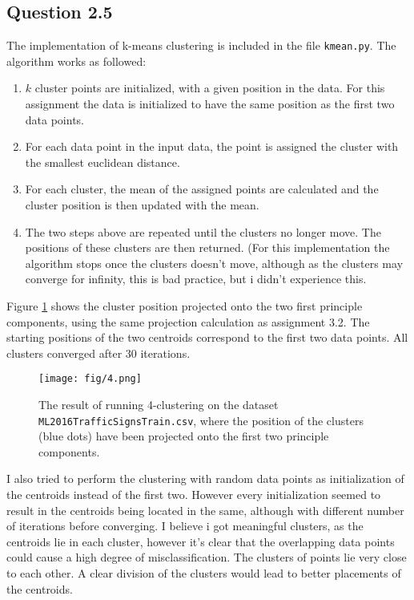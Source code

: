 \documentclass{article}
\begin{document}
\subsection{Question 2.5}
The implementation of k-means clustering is included in the file \texttt{kmean.py}. The algorithm works as followed:
\begin{enumerate}
\item{$k$ cluster points are initialized, with a given position in the data. For this assignment the data is initialized to have the same position as the first two data points.}
\item{For each data point in the input data, the point is assigned the cluster with the smallest euclidean distance.}
\item{For each cluster, the mean of the assigned points are calculated
and the cluster position is then updated with the mean.
}
\item{The two steps above are repeated until the clusters no longer move. The positions of these clusters are then returned. (For this implementation the algorithm stops once the clusters doesn't move, although as the clusters may converge for infinity, this is bad practice, but i didn't experience this.}
\end{enumerate}
Figure \ref{fig:clust1} shows the cluster position projected onto the two first principle components, using the same projection calculation as assignment 3.2. The starting positions of the two centroids correspond to the first two data points. All clusters converged after 30 iterations.
\begin{figure}[H]
  \centering
  \texttt{[image: fig/4.png]}
  \caption{The result of running 4-clustering on the dataset \texttt{ML2016TrafficSignsTrain.csv}, where the position of the clusters (blue dots) have been projected onto the first two principle components.
  }
  \label{fig:clust1}
\end{figure}
I also tried to perform the clustering with random data points as initialization of the centroids instead of the first two. However every initialization seemed to result in the centroids being located in the same, although with different number of iterations before converging. I believe i got meaningful clusters, as the centroids lie in each cluster, however it's clear that the overlapping data points could cause a high degree of misclassification. The clusters of points lie very close to each other. A clear division of the clusters would lead to better placements of the centroids.
\end{document}
